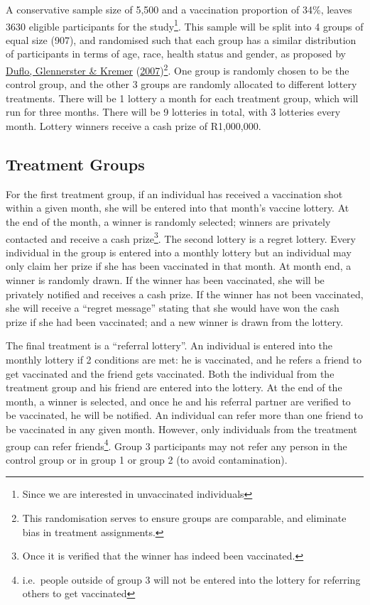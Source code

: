 \documentclass[11pt,preprint, authoryear]{elsarticle}
\numberwithin{equation}{section}
\numberwithin{figure}{section}
\numberwithin{table}{section}
\let\rmarkdownfootnote\footnote%
\def\footnote{\protect\rmarkdownfootnote}
\begin{document}
A conservative sample size of 5,500 and a vaccination proportion of
34\%, leaves 3630 eligible participants for the study\footnote{Since we
  are interested in unvaccinated individuals}. This sample will be split
into 4 groups of equal size (907), and randomised such that each group
has a similar distribution of participants in terms of age, race, health
status and gender, as proposed by \protect\hyperlink{ref-random}{Duflo,
Glennerster \& Kremer}
(\protect\hyperlink{ref-random}{2007})\footnote{This randomisation
  serves to ensure groups are comparable, and eliminate bias in
  treatment assignments.}. One group is randomly chosen to be the
control group, and the other 3 groups are randomly allocated to
different lottery treatments. There will be 1 lottery a month for each
treatment group, which will run for three months. There will be 9
lotteries in total, with 3 lotteries every month. Lottery winners
receive a cash prize of R1,000,000.

\hypertarget{treatment-groups}{%
\subsection{\texorpdfstring{Treatment Groups
\label{group}}{Treatment Groups }}\label{treatment-groups}}

For the first treatment group, if an individual has received a
vaccination shot within a given month, she will be entered into that
month's vaccine lottery. At the end of the month, a winner is randomly
selected; winners are privately contacted and receive a cash
prize\footnote{Once it is verified that the winner has indeed been
  vaccinated.}. The second lottery is a regret lottery. Every individual
in the group is entered into a monthly lottery but an individual may
only claim her prize if she has been vaccinated in that month. At month
end, a winner is randomly drawn. If the winner has been vaccinated, she
will be privately notified and receives a cash prize. If the winner has
not been vaccinated, she will receive a ``regret message'' stating that
she would have won the cash prize if she had been vaccinated; and a new
winner is drawn from the lottery.

The final treatment is a ``referral lottery''. An individual is entered
into the monthly lottery if 2 conditions are met: he is vaccinated, and
he refers a friend to get vaccinated and the friend gets vaccinated.
Both the individual from the treatment group and his friend are entered
into the lottery. At the end of the month, a winner is selected, and
once he and his referral partner are verified to be vaccinated, he will
be notified. An individual can refer more than one friend to be
vaccinated in any given month. However, only individuals from the
treatment group can refer friends\footnote{i.e.~people outside of group
  3 will not be entered into the lottery for referring others to get
  vaccinated}. Group 3 participants may not refer any person in the
control group or in group 1 or group 2 (to avoid contamination).
\end{document}
